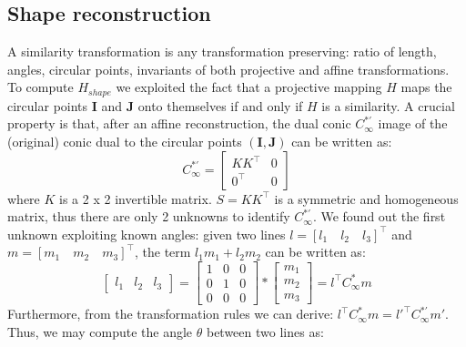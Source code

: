\documentclass[11pt, oneside]{article}
\begin{document}
\begin{figure}[!h]
\begin{minipage}{.55\textwidth}
		\label{image_affine_reconstruction}
	\end{minipage}
\end{figure}
\pagebreak

\subsection{Shape reconstruction} \label{shape_reconstruction}
A similarity transformation is any transformation preserving: ratio of length, angles, circular points, invariants of both projective and affine transformations. To compute $H_{shape}$ we exploited the fact that a projective mapping $H$ maps the circular points $\textbf{I}$ and $\textbf{J}$ onto themselves if and only if $H$ is  a similarity. A crucial property is that, after an affine reconstruction, the dual conic $C^{*'}_\infty$ image of the (original) conic dual to the circular points $(\textbf{I},\textbf{J})$ can be written as:
\begin{equation}
	C^{*'}_\infty = 
	\begin{bmatrix}
		KK^\intercal  & 0 \\ 0^\intercal & 0
	\end{bmatrix}
\end{equation}
where $K$ is a 2 x 2 invertible matrix. $S = KK^\intercal$ is a symmetric and homogeneous matrix, thus there are only 2 unknowns to identify $C^{*'}_\infty$. We found out the first unknown exploiting known angles: given two lines $l = [l_1\quad l_2 \quad l_3]^\intercal$ and $m = [m_1\quad m_2 \quad m_3]^\intercal$, the term $l_1 m_1 + l_2 m_2$ can be written as:
\begin{equation}
	\begin{bmatrix}
		l_1 & l_2 & l_3
	\end{bmatrix}
	=
	\begin{bmatrix}
		1 & 0 & 0 \\ 0 & 1 & 0 \\ 0 & 0 & 0
	\end{bmatrix} *
	\begin{bmatrix}
		m_1 \\ m_2 \\ m_3
	\end{bmatrix}
	= l^\intercal C^{*}_\infty m
\end{equation}
Furthermore, from the transformation rules we can derive: $l^\intercal C^{*}_\infty m = l{'^\intercal} C^{*'}_\infty m'$. Thus, we may compute the angle $\theta$ between two lines as:
\end{document}
